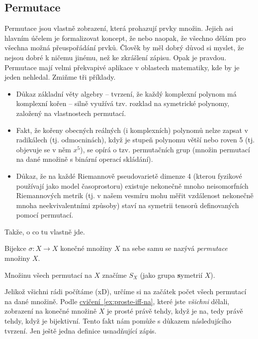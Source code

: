 \subsection{Permutace}
\label{ssec:permutace}

Permutace jsou vlastně zobrazení, která prohazují prvky množin. Jejich asi
hlavním účelem je formalizovat koncept, že  nebo naopak,
že všechno dělám pro všechna možná přeuspořádání prvků. Člověk by měl dobrý
důvod si myslet, že nejsou dobré k ničemu jinému, než ke zkrášlení zápisu. Opak
je pravdou. Permutace mají velmi překvapivé aplikace v oblastech matematiky, kde
by je jeden nehledal. Zmiňme tři příklady.
\begin{itemize}
 \item Důkaz základní věty algebry -- tvrzení, že každý komplexní polynom má
  komplexní kořen -- silně využívá tzv. rozklad na symetrické polynomy, založený
  na vlastnostech permutací.
 \item Fakt, že kořeny obecných reálných (i komplexních) polynomů nelze zapsat v
  radikálech (tj. odmocninách), když je stupeň polynomu větší nebo roven 5 (tj.
  objevuje se v něm $x^{5}$), se opírá o tzv.  permutačních
  grup (množin permutací na dané množině s binární operací skládání).
 \item Důkaz, že na každé Riemannově pseudovarietě dimenze 4 (kterou fyzikové
  používají jako model časoprostoru) existuje nekonečně mno\-ho neisomorfních
  Riemannových metrik (tj. v našem vesmíru mohu měřit vzdálenost nekonečně mnoha
  neekvivalentními způsoby) staví na symetrii tensorů definovaných pomocí
  permutací.
\end{itemize}

Takže, o co tu vlastně jde.
\begin{definition}[Permutace]
 \label{def:permutace}
 Bijekce $\sigma:X \to X$ konečné množiny $X$ na sebe samu se nazývá
 \emph{permutace} množiny $X$.

 Množinu všech permutací na $X$ značíme $S_X$ (jako grupa \textbf{s}ymetrií
 $X$). 
\end{definition}

Jelikož všichni rádi počítáme (xD), určíme si na začátek počet všech permutací
na dané množině. Podle
\hyperref[ex:proste-iff-na]{cvičení~\ref*{ex:proste-iff-na}}, které jste
\emph{všichni} dělali, zobrazení na konečné množině $X$ je prosté právě tehdy,
když je na, tedy právě tehdy, když je bijektivní. Tento fakt nám pomůže s
důkazem následujícího tvrzení. Jen ještě jedna definice usnadňující zápis.

